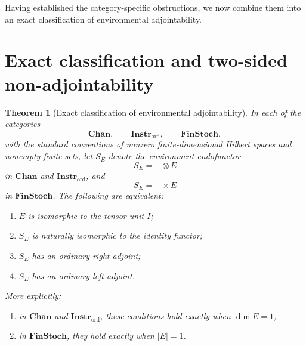 \documentclass[11pt]{article}
\newtheorem{theorem}{Theorem}[section]
\begin{document}
Having established the category-specific obstructions, we now combine them
into an exact classification of environmental adjointability.

\section{Exact classification and two-sided non-adjointability}
\label{sec:classification}

\begin{theorem}[Exact classification of environmental adjointability]
\label{thm:exact-classification}
In each of the categories
\[
\mathbf{Chan},\qquad
\mathbf{Instr}_{\mathrm{ord}},\qquad
\mathbf{FinStoch},
\]
with the standard conventions of nonzero finite-dimensional Hilbert spaces
and nonempty finite sets, let $S_E$ denote the environment endofunctor
\[
S_E=-\otimes E
\]
in $\mathbf{Chan}$ and $\mathbf{Instr}_{\mathrm{ord}}$, and
\[
S_E=-\times E
\]
in $\mathbf{FinStoch}$. The following are equivalent:
\begin{enumerate}
\item $E$ is isomorphic to the tensor unit $I$;
\item $S_E$ is naturally isomorphic to the identity functor;
\item $S_E$ has an ordinary right adjoint;
\item $S_E$ has an ordinary left adjoint.
\end{enumerate}
More explicitly:
\begin{enumerate}
\item in $\mathbf{Chan}$ and $\mathbf{Instr}_{\mathrm{ord}}$, these
conditions hold exactly when $\dim E=1$;
\item in $\mathbf{FinStoch}$, they hold exactly when $|E|=1$.
\end{enumerate}
\end{theorem}
\end{document}
